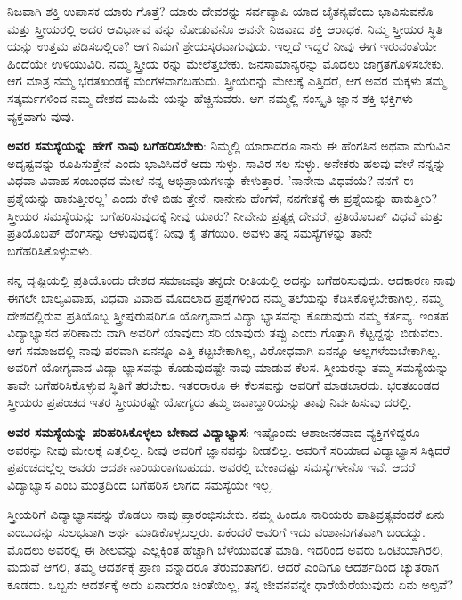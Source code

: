 ನಿಜವಾಗಿ ಶಕ್ತಿ ಉಪಾಸಕ ಯಾರು ಗೊತ್ತೆ? ಯಾರು ದೇವರನ್ನು ಸರ್ವವ್ಯಾಪಿ ಯಾದ ಚೈತನ್ಯವೆಂದು ಭಾವಿಸುವನೊ ಮತ್ತು ಸ್ತ್ರೀಯರಲ್ಲಿ ಅದರ ಆವಿರ್ಭಾವ ವನ್ನು ನೋಡುವನೊ ಅವನೇ ನಿಜವಾದ ಶಕ್ತಿ ಆರಾಧಕ. ನಿಮ್ಮ ಸ್ತ್ರೀಯರ ಸ್ಥಿತಿ ಯನ್ನು ಉತ್ತಮ ಪಡಿಸಬಲ್ಲಿರಾ? ಆಗ ನಿಮಗೆ ಶ್ರೇಯಸ್ಕರವಾಗುವುದು. ಇಲ್ಲದೆ ಇದ್ದರೆ ನೀವು ಈಗ ಇರುವಂತೆಯೇ ಹಿಂದೆಯೇ ಉಳಿಯುವಿರಿ. ನಮ್ಮ ಸ್ತ್ರೀಯ ರನ್ನು ಮೇಲೆತ್ತಬೇಕು. ಜನಸಾಮಾನ್ಯರನ್ನು ಮೊದಲು ಜಾಗ್ರತಗೊಳಿಸಬೇಕು. ಆಗ ಮಾತ್ರ ನಮ್ಮ ಭರತಖಂಡಕ್ಕೆ ಮಂಗಳವಾಗಬಹುದು. ಸ್ತ್ರೀಯರನ್ನು ಮೇಲಕ್ಕೆ ಎತ್ತಿದರೆ, ಆಗ ಅವರ ಮಕ್ಕಳು ತಮ್ಮ ಸತ್ಕರ್ಮಗಳಿಂದ ನಮ್ಮ ದೇಶದ ಮಹಿಮೆ ಯನ್ನು ಹೆಚ್ಚಿಸುವರು. ಆಗ ನಮ್ಮಲ್ಲಿ ಸಂಸ್ಕೃತಿ ಜ್ಞಾನ ಶಕ್ತಿ ಭಕ್ತಿಗಳು ವ್ಯಕ್ತವಾಗು ವುವು.

\textbf{ಅವರ ಸಮಸ್ಯೆಯನ್ನು ಹೇಗೆ ನಾವು ಬಗೆಹರಿಸಬೇಕು}: ನಿಮ್ಮಲ್ಲಿ ಯಾರಾದರೂ ನಾನು ಈ ಹೆಂಗಸಿನ ಅಥವಾ ಮಗುವಿನ ಅದೃಷ್ಟವನ್ನು ರೂಪಿಸುತ್ತೇನೆ ಎಂದು ಭಾವಿಸಿದರೆ ಅದು ಸುಳ್ಳು. ಸಾವಿರ ಸಲ ಸುಳ್ಳು. ಅನೇಕರು ಹಲವು ವೇಳೆ ನನ್ನನ್ನು ವಿಧವಾ ವಿವಾಹ ಸಂಬಂಧದ ಮೇಲೆ ನನ್ನ ಅಭಿಪ್ರಾಯಗಳನ್ನು ಕೇಳುತ್ತಾರೆ. 'ನಾನೇನು ವಿಧವೆಯೆ? ನನಗೆ ಈ ಪ್ರಶ್ನೆಯನ್ನು ಹಾಕುತ್ತೀರಲ್ಲ' ಎಂದು ಕೇಳಿ ಬಿಡು ತ್ತೇನೆ. ನಾನೇನು ಹೆಂಗಸೆ, ನನಗೇತಕ್ಕೆ ಈ ಪ್ರಶ್ನೆಯನ್ನು ಹಾಕುತ್ತೀರಿ? ಸ್ತ್ರೀಯರ ಸಮಸ್ಯೆಯನ್ನು ಬಗೆಹರಿಸುವುದಕ್ಕೆ ನೀವು ಯಾರು? ನೀವೇನು ಪ್ರತ್ಯಕ್ಷ ದೇವರೆ, ಪ್ರತಿಯೊಬಪ್ ವಿಧವೆ ಮತ್ತು ಪ್ರತಿಯೊಬಪ್ ಹೆಂಗಸನ್ನು ಆಳುವುದಕ್ಕೆ? ನೀವು ಕೈ ತೆಗೆಯಿರಿ. ಅವಳು ತನ್ನ ಸಮಸ್ಯೆಗಳನ್ನು ತಾನೇ ಬಗೆಹರಿಸಿಕೊಳ್ಳುವಳು.

ನನ್ನ ದೃಷ್ಟಿಯಲ್ಲಿ ಪ್ರತಿಯೊಂದು ದೇಶದ ಸಮಾಜವೂ ತನ್ನದೇ ರೀತಿಯಲ್ಲಿ ಅದನ್ನು ಬಗೆಹರಿಸುವುದು. ಆದಕಾರಣ ನಾವು ಈಗಲೇ ಬಾಲ್ಯವಿವಾಹ, ವಿಧವಾ ವಿವಾಹ ಮೊದಲಾದ ಪ್ರಶ್ನೆಗಳಿಂದ ನಮ್ಮ ತಲೆಯನ್ನು ಕೆಡಿಸಿಕೊಳ್ಳಬೇಕಾಗಿಲ್ಲ. ನಮ್ಮ ದೇಶದಲ್ಲಿರುವ ಪ್ರತಿಯೊಬ್ಬ ಸ್ತ್ರೀಪುರುಷರಿಗೂ ಯೋಗ್ಯವಾದ ವಿದ್ಯಾ ಭ್ಯಾಸವನ್ನು ಕೊಡುವುದು ನಮ್ಮ ಕರ್ತವ್ಯ. ಇಂತಹ ವಿದ್ಯಾಭ್ಯಾಸದ ಪರಿಣಾಮ ವಾಗಿ ಅವರಿಗೆ ಯಾವುದು ಸರಿ ಯಾವುದು ತಪ್ಪು ಎಂದು ಗೊತ್ತಾಗಿ ಕೆಟ್ಟದ್ದನ್ನು ಬಿಡುವರು. ಆಗ ಸಮಾಜದಲ್ಲಿ ನಾವು ಪರವಾಗಿ ಏನನ್ನೂ ಎತ್ತಿ ಕಟ್ಟಬೇಕಾಗಿಲ್ಲ, ವಿರೋಧವಾಗಿ ಏನನ್ನೂ ಅಲ್ಲಗಳೆಯಬೇಕಾಗಿಲ್ಲ. ಅವರಿಗೆ ಯೋಗ್ಯವಾದ ವಿದ್ಯಾ ಭ್ಯಾಸವನ್ನು ಕೊಡುವುದಷ್ಟೇ ನಾವು ಮಾಡುವ ಕೆಲಸ. ಸ್ತ್ರೀಯರನ್ನು ತಮ್ಮ ಸಮಸ್ಯೆಯನ್ನು ತಾವೇ ಬಗೆಹರಿಸಿಕೊಳ್ಳುವ ಸ್ಥಿತಿಗೆ ತರಬೇಕು. ಇತರರಾರೂ ಈ ಕೆಲಸವನ್ನು ಅವರಿಗೆ ಮಾಡಬಾರದು. ಭರತಖಂಡದ ಸ್ತ್ರೀಯರು ಪ್ರಪಂಚದ ಇತರ ಸ್ತ್ರೀಯರಷ್ಟೇ ಯೋಗ್ಯರು ತಮ್ಮ ಜವಾಬ್ದಾರಿಯನ್ನು ತಾವು ನಿರ್ವಹಿಸುವು ದರಲ್ಲಿ.

\textbf{ಅವರ ಸಮಸ್ಯೆಯನ್ನು ಪರಿಹರಿಸಿಕೊಳ್ಳಲು ಬೇಕಾದ ವಿದ್ಯಾಭ್ಯಾಸ}: ಇಷ್ಟೊಂದು ಆಶಾಜನಕವಾದ ವ್ಯಕ್ತಿಗಳಿದ್ದರೂ ಅವರನ್ನು ನೀವು ಮೇಲಕ್ಕೆ ಎತ್ತಲಿಲ್ಲ. ನೀವು ಅವರಿಗೆ ಜ್ಞಾನವನ್ನು ನೀಡಲಿಲ್ಲ. ಅವರಿಗೆ ಸರಿಯಾದ ವಿದ್ಯಾಭ್ಯಾಸ ಸಿಕ್ಕಿದರೆ ಪ್ರಪಂಚದಲ್ಲೆಲ್ಲ ಅವರು ಆದರ್ಶನಾರಿಯರಾಗಬಹುದು. ಅವರಲ್ಲಿ ಬೇಕಾದಷ್ಟು ಸಮಸ್ಯೆಗಳೇನೊ ಇವೆ. ಆದರೆ ವಿದ್ಯಾಭ್ಯಾಸ ಎಂಬ ಮಂತ್ರದಿಂದ ಬಗೆಹರಿಸ ಲಾಗದ ಸಮಸ್ಯೆಯೇ ಇಲ್ಲ.

ಸ್ತ್ರೀಯರಿಗೆ ವಿದ್ಯಾಭ್ಯಾಸವನ್ನು ಕೊಡಲು ನಾವು ಪ್ರಾರಂಭಿಸಬೇಕು. ನಮ್ಮ ಹಿಂದೂ ನಾರಿಯರು ಪಾತಿವ್ರತ್ಯವೆಂದರೆ ಏನು ಎಂಬುದನ್ನು ಸುಲಭವಾಗಿ ಅರ್ಥ ಮಾಡಿಕೊಳ್ಳಬಲ್ಲರು. ಏಕೆಂದರೆ ಅವರಿಗೆ ಇದು ವಂಶಾನುಗತವಾಗಿ ಬಂದದ್ದು. ಮೊದಲು ಅವರಲ್ಲಿ ಈ ಶೀಲವನ್ನು ಎಲ್ಲಕ್ಕಿಂತ ಹೆಚ್ಚಾಗಿ ಬೆಳೆಯುವಂತೆ ಮಾಡಿ. ಇದರಿಂದ ಅವರು ಒಂಟಿಯಾಗಿರಲಿ, ಮದುವೆ ಆಗಲಿ, ತಮ್ಮ ಆದರ್ಶಕ್ಕೆ ಪ್ರಾಣ ವನ್ನಾದರೂ ತೆರುವಂತಾಗಲಿ. ಆದರೆ ಎಂದಿಗೂ ಆದರ್ಶದಿಂದ ಚ್ಯುತರಾಗ ಕೂಡದು. ಒಬ್ಬನು ಆದರ್ಶಕ್ಕೆ ಅದು ಏನಾದರೂ ಚಿಂತೆಯಿಲ್ಲ, ತನ್ನ ಜೀವನವನ್ನೇ ಧಾರೆಯೆರೆಯುವುದು ಏನು ಅಲ್ಪವೆ?

